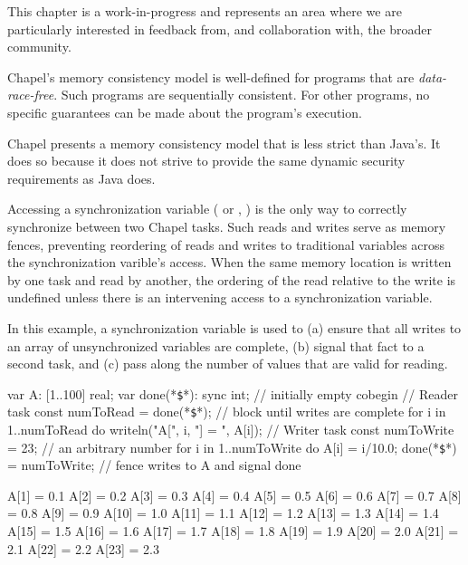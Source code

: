\label{Memory_Consistency_Model}

\begin{openissue}
  This chapter is a work-in-progress and represents an area where we
  are particularly interested in feedback from, and collaboration
  with, the broader community.
\end{openissue}

Chapel's memory consistency model is well-defined for programs that
are {\em data-race-free}.  Such programs are sequentially consistent.
For other programs, no specific guarantees can be made about the
program's execution.

\begin{rationale}
  Chapel presents a memory consistency model that is less strict than
  Java's.  It does so because it does not strive to provide the same
  dynamic security requirements as Java does.
\end{rationale}

Accessing a synchronization variable ( or , ) is
the only way to correctly synchronize between two Chapel tasks.
Such reads and writes serve as memory fences, preventing
reordering of reads and writes to traditional variables across the
synchronization varible's access.  When the same memory location
is written by one task and read by another, the ordering of the
read relative to the write is undefined unless there is an intervening
access to a synchronization variable.

\begin{example}
  In this example, a synchronization variable is used to (a) ensure that
  all writes to an array of unsynchronized variables are complete, (b)
  signal that fact to a second task, and (c) pass along the number of
  values that are valid for reading.

\begin{chapel}
var A: [1..100] real;
var done(*\texttt{\$}*): sync int;           // initially empty
cobegin {
  { // Reader task
    const numToRead = done(*\texttt{\$}*);   // block until writes are complete
    for i in 1..numToRead do
      writeln("A[", i, "] = ", A[i]);
  }
  {  // Writer task
    const numToWrite = 23;     // an arbitrary number
    for i in 1..numToWrite do
      A[i] = i/10.0;
    done(*\texttt{\$}*) = numToWrite;        // fence writes to A and signal done
  }
}
\end{chapel}
\begin{chapeloutput}
A[1] = 0.1
A[2] = 0.2
A[3] = 0.3
A[4] = 0.4
A[5] = 0.5
A[6] = 0.6
A[7] = 0.7
A[8] = 0.8
A[9] = 0.9
A[10] = 1.0
A[11] = 1.1
A[12] = 1.2
A[13] = 1.3
A[14] = 1.4
A[15] = 1.5
A[16] = 1.6
A[17] = 1.7
A[18] = 1.8
A[19] = 1.9
A[20] = 2.0
A[21] = 2.1
A[22] = 2.2
A[23] = 2.3
\end{chapeloutput}
\end{example}


